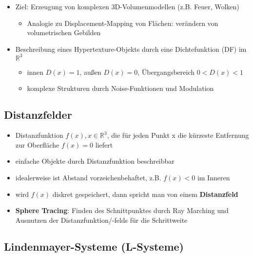 \documentclass[paper=a4, fontsize=11pt]{scrartcl} %
\numberwithin{equation}{section} %
\numberwithin{figure}{section} %
\numberwithin{table}{section} %
\begin{document}
\begin{itemize}
\item Ziel: Erzeugung von komplexen 3D-Volumenmodellen (z.B. Feuer, Wolken)
\begin{itemize}
\item Analogie zu Displacement-Mapping von Flächen: verändern von volumetrischen Gebilden
\end{itemize}
\item Beschreibung eines Hypertexture-Objekts durch eine Dichtefunktion (DF) im $\mathbb{R}^3$
\begin{itemize}
\item innen $D(x) = 1$, außen $D(x) = 0$, Übergangsbereich $0 < D(x) < 1$
\item komplexe Strukturen durch Noise-Funktionen und Modulation
\end{itemize}
\end{itemize}

\subsection{Distanzfelder}

\begin{itemize}
\item Distanzfunktion $f(x), x \in \mathbb{R}^3$, die für jeden Punkt x die kürzeste Entfernung zur Oberfläche $f(x) = 0$ liefert
\item einfache Objekte durch Distanzfunktion beschreibbar
\item idealerweise ist Abstand vorzeichenbehaftet, z.B. $f(x) < 0$ im Inneren
\item wird $f(x)$ diskret gespeichert, dann spricht man von einem \textbf{Distanzfeld}
\item \textbf{Sphere Tracing}: Finden des Schnittpunktes durch Ray Marching und Ausnutzen der Distanzfunktion/-felds für die Schrittweite
\end{itemize}

\subsection{Lindenmayer-Systeme (L-Systeme)}
\end{document}
